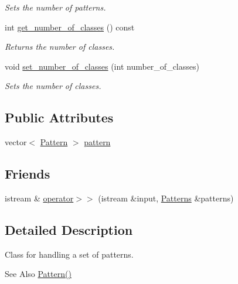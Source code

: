 \begin{DoxyCompactItemize}
\begin{DoxyCompactList}\small\item\em Sets the number of patterns. \end{DoxyCompactList}\item 
int \hyperlink{classPatterns_aea4f00f4ee4d22876ac8f6850098c3e1}{get\+\_\+number\+\_\+of\+\_\+classes} () const 
\begin{DoxyCompactList}\small\item\em Returns the number of classes. \end{DoxyCompactList}\item 
void \hyperlink{classPatterns_adcfd5d41467f7174f12c139adcbea384}{set\+\_\+number\+\_\+of\+\_\+classes} (int number\+\_\+of\+\_\+classes)
\begin{DoxyCompactList}\small\item\em Sets the number of classes. \end{DoxyCompactList}\end{DoxyCompactItemize}
\subsection*{Public Attributes}
\begin{DoxyCompactItemize}
\item 
vector$<$ \hyperlink{classPattern}{Pattern} $>$ \hyperlink{classPatterns_ada129f464f3a816c5658f441f8c937ce}{pattern}
\end{DoxyCompactItemize}
\subsection*{Friends}
\begin{DoxyCompactItemize}
\item 
istream \& \hyperlink{classPatterns_aed3f40599aaf63a1f5126b3acac33fb4}{operator$>$$>$} (istream \&input, \hyperlink{classPatterns}{Patterns} \&patterns)
\end{DoxyCompactItemize}


\subsection{Detailed Description}
Class for handling a set of patterns. 

\begin{DoxySeeAlso}{See Also}
\hyperlink{classPattern}{Pattern()} 
\end{DoxySeeAlso}


